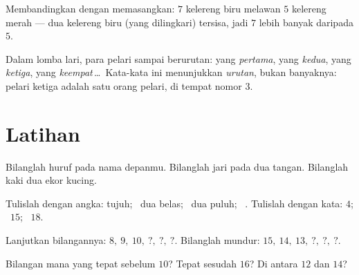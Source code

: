 \begin{omfigure}

{\small Membandingkan dengan memasangkan: $7$ kelereng biru melawan
$5$ kelereng merah --- dua kelereng biru (yang dilingkari) tersisa,
jadi $7$ lebih banyak daripada $5$.}
\end{omfigure}

\begin{example}\label{ex:g1:counting:ordinal}
Dalam lomba lari, para pelari sampai berurutan: yang \emph{pertama},
yang \emph{kedua}, yang \emph{ketiga}, yang \emph{keempat}\,\dots\
Kata-kata ini menunjukkan \emph{urutan}, bukan banyaknya: pelari
ketiga adalah satu orang pelari, di tempat nomor $3$.
\end{example}

\section{Latihan}

\begin{exercise}[$\star$]\label{exo:g1:counting:1}
Bilanglah huruf pada nama depanmu. Bilanglah jari pada dua tangan.
Bilanglah kaki dua ekor kucing.
\end{exercise}

\begin{exercise}[$\star$]\label{exo:g1:counting:2}
Tulislah dengan angka: tujuh; \ dua belas; \ dua puluh; \ .
Tulislah dengan kata: $4$; \ $15$; \ $18$.
\end{exercise}

\begin{exercise}[$\star$]\label{exo:g1:counting:3}
Lanjutkan bilangannya: $8,\ 9,\ 10,\ ?,\ ?,\ ?$. Bilanglah mundur:
$15,\ 14,\ 13,\ ?,\ ?,\ ?$.
\end{exercise}

\begin{exercise}[$\star$]\label{exo:g1:counting:4}
Bilangan mana yang tepat sebelum $10$? Tepat sesudah $16$? Di antara
$12$ dan $14$?
\end{exercise}


